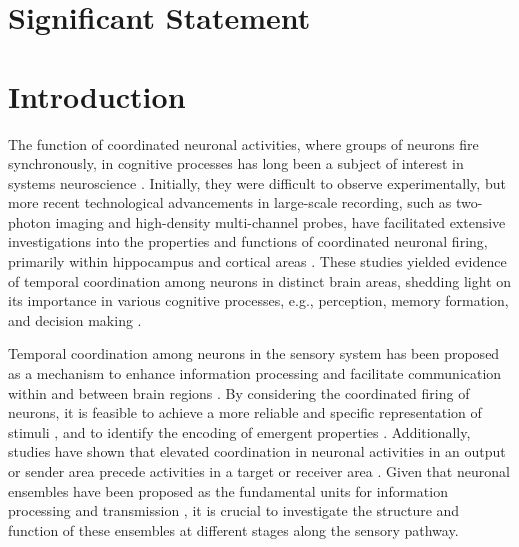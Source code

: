\documentclass[11pt]{article}
\begin{document}
\section*{Significant Statement}
\begin{comment}
(120 Words Maximum)
The Significance Statement should provide a clear explanation of the importance and relevance of the research in a manner accessible to researchers without specialized knowledge in the field and informed lay readers.
\end{comment}


\section*{Introduction}
\begin{comment}
(650 Words Maximum)
The Introduction should briefly indicate the objectives of the study and
provide enough background information to clarify why the study was
undertaken and what hypotheses were tested.
\end{comment}
The function of coordinated neuronal activities, where groups of neurons fire synchronously, in cognitive processes has long been a subject of interest in systems neuroscience \citep{hebb1949organization, konorski1948conditioned}. Initially, they were difficult to observe experimentally, but more recent technological advancements in large-scale recording, such as two-photon imaging and high-density multi-channel probes, have facilitated extensive investigations into the properties and functions of coordinated neuronal firing, primarily within hippocampus and cortical areas \citep{Buzsaki2010, Oberto2021}. These studies yielded evidence of temporal coordination among neurons in distinct brain areas, shedding light on its importance in various cognitive processes, e.g., perception, memory formation, and decision making \citep{baeg2003dynamics, bathellier2012discrete, Bizley2010, boucly2022flexible, domanski2023distinct, harris2003organization, laubach2000cortical, Oberto2021}.

Temporal coordination among neurons in the sensory system has been proposed as a mechanism to enhance information processing \citep{dan1998coding, kreiter1996stimulus, See2018, See2021} and facilitate communication within and between brain regions \citep{zandvakili2015coordinated}. By considering the coordinated firing of neurons, it is feasible to achieve a more reliable and specific representation of stimuli \citep{ebrahimi2022emergent, See2018, See2021, yoshida2020natural}, and to identify the encoding of emergent properties \citep{decharms1996primary, shahidi2019high}. Additionally, studies have shown that elevated coordination in neuronal activities in an output or sender area precede activities in a target or receiver area \citep{zandvakili2015coordinated}. Given that neuronal ensembles have been proposed as the fundamental units for information processing and transmission \citep{Buzsaki2010, yuste2015neuron}, it is crucial to investigate the structure and function of these ensembles at different stages along the sensory pathway.
\end{document}
